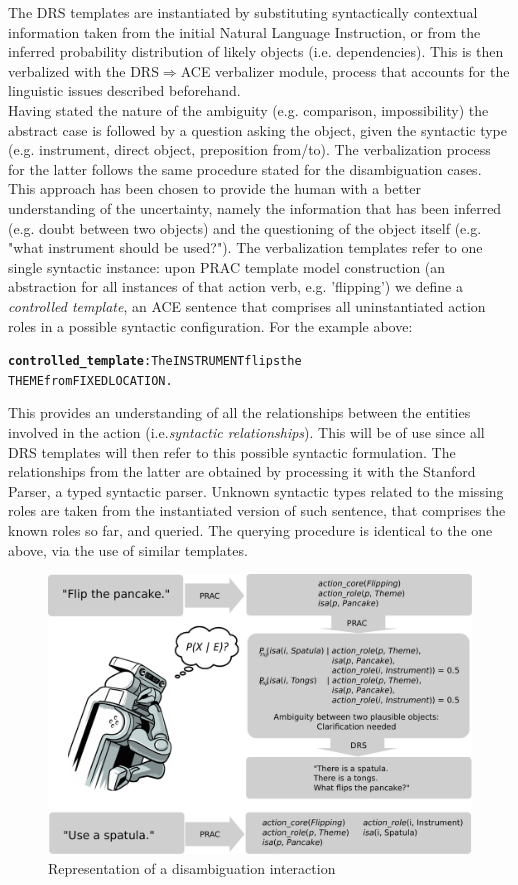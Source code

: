 \documentclass[oribibl]{llncs}
\begin{document}
The DRS templates are instantiated by substituting 
syntactically contextual information taken from the initial Natural 
Language Instruction, or from the inferred probability distribution 
of likely objects (i.e. dependencies). This is then verbalized with 
the DRS$\Rightarrow$ACE verbalizer module, process that accounts for 
the linguistic issues described beforehand.\\ Having stated the 
nature of the ambiguity (e.g. comparison, impossibility) the 
abstract case is followed by a question asking the object, 
given the syntactic type (e.g. instrument, direct object, 
preposition from/to). The verbalization process for the latter 
follows the same procedure stated for the disambiguation cases. \\ 
This approach has been chosen to provide the human with a better
 understanding of the uncertainty, namely the information that has
  been inferred (e.g. doubt between two objects) and the questioning 
  of the object itself (e.g. "what instrument should be used?"). 
  The verbalization templates refer to one single syntactic instance: upon PRAC template 
model construction (an abstraction for all instances of that action 
verb, e.g. 'flipping') we define a \textit{controlled template}, an 
ACE sentence that comprises all uninstantiated action roles in a 
possible syntactic configuration. For the example above: 

{\small 
\begin{alltt} \textbf{controlled_template}: The INSTRUMENT flips the 
THEME from FIXEDLOCATION. \end{alltt} }

This provides an understanding of all the relationships between 
the entities involved in the action (i.e.\textit{syntactic relationships}). 
This will be of use since all DRS templates will then refer to this 
possible syntactic formulation. The relationships from the latter 
are obtained by processing it with the Stanford Parser\cite
{mcdm08b}, a typed syntactic parser. Unknown syntactic types related 
to the missing roles are taken from the instantiated version of such 
sentence, that comprises the known roles so far, and queried. The 
querying procedure is identical to the one above, via the use of 
similar templates.
\begin{figure}[t]
\centering
\includegraphics[width=0.9\columnwidth]{results.pdf}
\caption{Representation of a disambiguation interaction}
\label{fig:pipeline}
\end{figure} 
\end{document}

